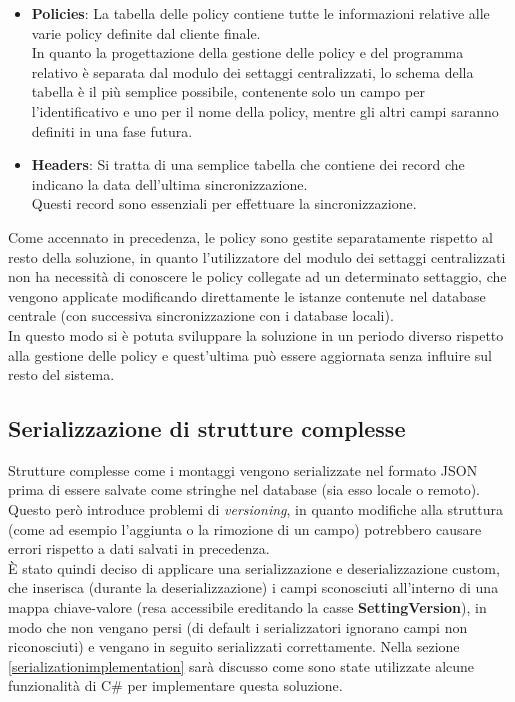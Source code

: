 \documentclass[\main/tesi.tex]{subfiles}
\begin{document}
\begin{itemize}
    \item \textbf{Policies}: La tabella delle policy contiene tutte le informazioni relative alle varie policy definite dal cliente finale.\\In quanto la progettazione della gestione delle policy e del programma relativo è separata dal modulo dei settaggi centralizzati, lo schema della tabella è il più semplice possibile, contenente solo un campo per l'identificativo e uno per il nome della policy, mentre gli altri campi saranno definiti in una fase futura.
    \item \textbf{Headers}: Si tratta di una semplice tabella che contiene dei record che indicano la data dell'ultima sincronizzazione.\\Questi record sono essenziali per effettuare la sincronizzazione.
\end{itemize}

Come accennato in precedenza, le policy sono gestite separatamente rispetto al resto della soluzione, in quanto l'utilizzatore del modulo dei settaggi centralizzati non ha necessità di conoscere le policy collegate ad un determinato settaggio, che vengono applicate modificando direttamente le istanze contenute nel database centrale (con successiva sincronizzazione con i database locali).\\
In questo modo si è potuta sviluppare la soluzione in un periodo diverso rispetto alla gestione delle policy e quest'ultima può essere aggiornata senza influire sul resto del sistema.

\subsection{Serializzazione di strutture complesse}
\label{serialization}
Strutture complesse come i montaggi vengono serializzate nel formato JSON prima di essere salvate come stringhe nel database (sia esso locale o remoto).\\
Questo però introduce problemi di \textit{versioning}, in quanto modifiche alla struttura (come ad esempio l'aggiunta o la rimozione di un campo) potrebbero causare errori rispetto a dati salvati in precedenza.\\
È stato quindi deciso di applicare una serializzazione e deserializzazione custom, che inserisca (durante la deserializzazione) i campi sconosciuti all'interno di una mappa chiave-valore (resa accessibile ereditando la casse \textbf{SettingVersion}), in modo che non vengano persi (di default i serializzatori ignorano campi non riconosciuti) e vengano in seguito serializzati correttamente.
Nella sezione \ref{serializationimplementation} sarà discusso come sono state utilizzate alcune funzionalità di C\# per implementare questa soluzione.
\end{document}
